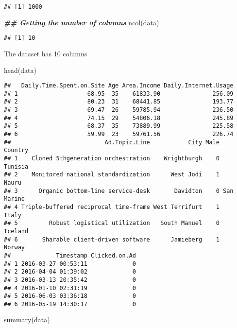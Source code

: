 \documentclass[
]{article}
\newenvironment{Shaded}{\begin{snugshade}}{\end{snugshade}}
\newcommand{\DocumentationTok}[1]{\textcolor[rgb]{0.56,0.35,0.01}{\textbf{\textit{#1}}}}
\newcommand{\FunctionTok}[1]{\textcolor[rgb]{0.00,0.00,0.00}{#1}}
\newcommand{\NormalTok}[1]{#1}
\begin{document}
\begin{verbatim}
## [1] 1000
\end{verbatim}

\begin{Shaded}
\begin{Highlighting}[]
\DocumentationTok{\#\# Getting the number of columns}
\FunctionTok{ncol}\NormalTok{(data)}
\end{Highlighting}
\end{Shaded}

\begin{verbatim}
## [1] 10
\end{verbatim}

The dataset has 10 columns

\begin{Shaded}
\begin{Highlighting}[]
\FunctionTok{head}\NormalTok{(data)}
\end{Highlighting}
\end{Shaded}

\begin{verbatim}
##   Daily.Time.Spent.on.Site Age Area.Income Daily.Internet.Usage
## 1                    68.95  35    61833.90               256.09
## 2                    80.23  31    68441.85               193.77
## 3                    69.47  26    59785.94               236.50
## 4                    74.15  29    54806.18               245.89
## 5                    68.37  35    73889.99               225.58
## 6                    59.99  23    59761.56               226.74
##                           Ad.Topic.Line           City Male    Country
## 1    Cloned 5thgeneration orchestration    Wrightburgh    0    Tunisia
## 2    Monitored national standardization      West Jodi    1      Nauru
## 3      Organic bottom-line service-desk       Davidton    0 San Marino
## 4 Triple-buffered reciprocal time-frame West Terrifurt    1      Italy
## 5         Robust logistical utilization   South Manuel    0    Iceland
## 6       Sharable client-driven software      Jamieberg    1     Norway
##             Timestamp Clicked.on.Ad
## 1 2016-03-27 00:53:11             0
## 2 2016-04-04 01:39:02             0
## 3 2016-03-13 20:35:42             0
## 4 2016-01-10 02:31:19             0
## 5 2016-06-03 03:36:18             0
## 6 2016-05-19 14:30:17             0
\end{verbatim}

\begin{Shaded}
\begin{Highlighting}[]
\FunctionTok{summary}\NormalTok{(data)}
\end{Highlighting}
\end{Shaded}
\end{document}
